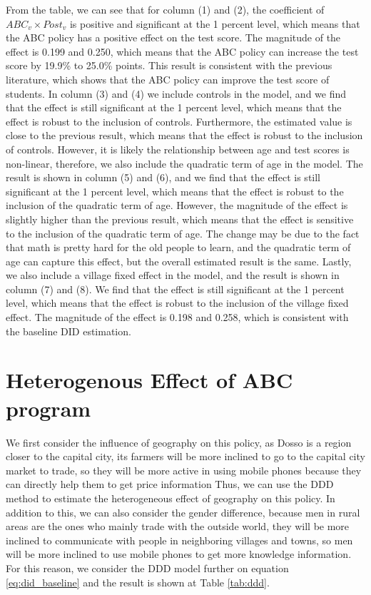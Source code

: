 \documentclass[12pt]{jfm}
\begin{document}
From the table, we can see that for column (1) and (2), the coefficient of $ABC_v \times Post_v$ is positive and significant at the 1 percent level, which means that the ABC policy has a positive effect on the test score. The magnitude of the effect is 0.199 and 0.250, which means that the ABC policy can increase the test score by 19.9\% to 25.0\% points. This result is consistent with the previous literature, which shows that the ABC policy can improve the test score of students. In column (3) and (4) we include controls in the model, and we find that the effect is still significant at the 1 percent level, which means that the effect is robust to the inclusion of controls. Furthermore, the estimated value is close to the previous result, which means that the effect is robust to the inclusion of controls. However, it is likely the relationship between age and test scores is non-linear, therefore, we also include the quadratic term of age in the model. The result is shown in column (5) and (6), and we find that the effect is still significant at the 1 percent level, which means that the effect is robust to the inclusion of the quadratic term of age. However, the magnitude of the effect is slightly higher than the previous result, which means that the effect is sensitive to the inclusion of the quadratic term of age. The change may be due to the fact that math is pretty hard for the old people to learn, and the quadratic term of age can capture this effect, but the overall estimated result is the same. Lastly, we also include a village fixed effect in the model, and the result is shown in column (7) and (8). We find that the effect is still significant at the 1 percent level, which means that the effect is robust to the inclusion of the village fixed effect. The magnitude of the effect is 0.198 and 0.258, which is consistent with the baseline DID estimation.

\section{Heterogenous Effect of ABC program} \label{sec:heterogenous}

We first consider the influence of geography on this policy, as Dosso is a region closer to the capital city, its farmers will be more inclined to go to the capital city market to trade, so they will be more active in using mobile phones because they can directly help them to get price information \citep{doi:10.1080/02681102.2015.1048184} Thus, we can use the DDD method to estimate the heterogeneous effect of geography on this policy. In addition to this, we can also consider the gender difference, because men in rural areas are the ones who mainly trade with the outside world, they will be more inclined to communicate with people in neighboring villages and towns, so men will be more inclined to use mobile phones to get more knowledge information. For this reason, we consider the DDD model further on equation \eqref{eq:did_baseline} and the result is shown at Table \ref{tab:ddd}.
\end{document}
